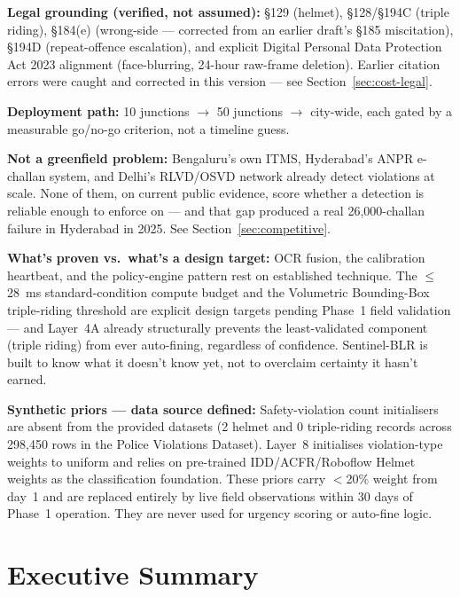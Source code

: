 \documentclass[11pt,a4paper]{article}
\begin{document}
\begin{callout}
\textbf{Legal grounding (verified, not assumed):} \S129 (helmet), \S128/\S194C (triple riding), \S184(e) (wrong-side --- corrected from an earlier draft's \S185 miscitation), \S194D (repeat-offence escalation), and explicit Digital Personal Data Protection Act 2023 alignment (face-blurring, 24-hour raw-frame deletion). Earlier citation errors were caught and corrected in this version --- see Section~\ref{sec:cost-legal}.

\textbf{Deployment path:} 10 junctions $\rightarrow$ 50 junctions $\rightarrow$ city-wide, each gated by a measurable go/no-go criterion, not a timeline guess.

\textbf{Not a greenfield problem:} Bengaluru's own ITMS, Hyderabad's ANPR e-challan system, and Delhi's RLVD/OSVD network already detect violations at scale. None of them, on current public evidence, score whether a detection is reliable enough to enforce on --- and that gap produced a real 26,000-challan failure in Hyderabad in 2025. See Section~\ref{sec:competitive}.

\vspace{0.3em}
\textbf{What's proven vs.\ what's a design target:} OCR fusion, the calibration heartbeat, and the policy-engine pattern rest on established technique. The $\leq$28~ms standard-condition compute budget and the Volumetric Bounding-Box triple-riding threshold are explicit design targets pending Phase~1 field validation --- and Layer~4A already structurally prevents the least-validated component (triple riding) from ever auto-fining, regardless of confidence. Sentinel-BLR is built to know what it doesn't know yet, not to overclaim certainty it hasn't earned.

\vspace{0.3em}
\textbf{Synthetic priors --- data source defined:} Safety-violation count initialisers are absent from the provided datasets (2 helmet and 0 triple-riding records across 298,450 rows in the Police Violations Dataset). Layer~8 initialises violation-type weights to uniform and relies on pre-trained IDD/ACFR/Roboflow Helmet weights as the classification foundation. These priors carry $<$20\% weight from day~1 and are replaced entirely by live field observations within 30 days of Phase~1 operation. They are never used for urgency scoring or auto-fine logic.

\end{callout}


\section{Executive Summary}
\end{document}
